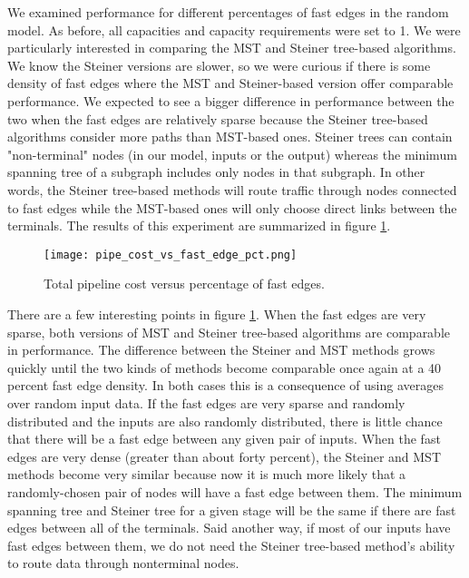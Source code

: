\documentclass{acmart}
\begin{document}
	We examined performance for different percentages of fast edges in the random model. As before, all capacities and capacity requirements were set to 1. We were particularly interested in comparing the MST and Steiner tree-based algorithms. We know the Steiner versions are slower, so we were curious if there is some density of fast edges where the MST and Steiner-based version offer comparable performance. We expected to see a bigger difference in performance between the two when the fast edges are relatively sparse because the Steiner tree-based algorithms consider more paths than MST-based ones. Steiner trees can contain "non-terminal" nodes (in our model, inputs or the output) whereas the minimum spanning tree of a subgraph includes only nodes in that subgraph.  In other words, the Steiner tree-based methods will route traffic through nodes connected to fast edges while the MST-based ones will only choose direct links between the terminals. The results of this experiment are summarized in figure \ref{fig:perf_fe}.
	\begin{figure}[H]
	    \centering
	    \texttt{[image: pipe\_cost\_vs\_fast\_edge\_pct.png]}
	    \caption{Total pipeline cost versus percentage of fast edges.}
	    \label{fig:perf_fe}
	\end{figure}
	There are a few interesting points in figure \ref{fig:perf_fe}. When the fast edges are very sparse, both versions of MST and Steiner tree-based algorithms are comparable in performance. The difference between the Steiner and MST methods grows quickly until the two kinds of methods become comparable once again at a 40 percent fast edge density. In both cases this is a consequence of using averages over random input data. If the fast edges are very sparse and randomly distributed and the inputs are also randomly distributed, there is little chance that there will be a fast edge between any given pair of inputs. When the fast edges are very dense (greater than about forty percent), the Steiner and MST methods become very similar because now it is much more likely that a randomly-chosen pair of nodes will have a fast edge between them. The minimum spanning tree and Steiner tree for a given stage will be the same if there are fast edges between all of the terminals. Said another way, if most of our inputs have fast edges between them, we do not need the Steiner tree-based method's ability to route data through nonterminal nodes.
	
\end{document}
